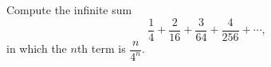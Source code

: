 Compute the infinite sum
\[\dfrac{1}{4}+\dfrac{2}{16}+\dfrac{3}{64}+\dfrac{4}{256}+\cdots,\]
in which the $n$th term is $\dfrac{n}{4^n}$.
